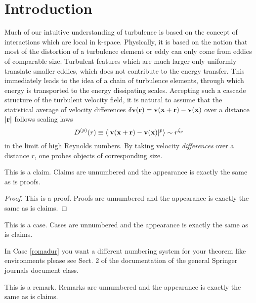 \documentclass[dc]{svjour}
\begin{document}

\section{Introduction}
\label{sec:intro}

Much of our intuitive understanding of turbulence is based on the
concept of interactions which are local in k-space. Physically,
it is based on the notion that most of the distortion of a turbulence
element or eddy can only come from eddies of comparable size.
Turbulent features which are much larger only uniformly translate
smaller eddies, which does not contribute to the energy transfer.
This immediately leads to the idea of a chain of turbulence elements,
through which energy is transported to the energy dissipating
scales. Accepting such a cascade structure of the turbulent velocity
field, it is natural to assume that the statistical average
of velocity differences ${\bf \delta v(r) = v(x+r) - v(x)}$ over a distance
$|{\bf r}|$ follows scaling laws
\begin{equation}
  \label{vscaling}
     D^{(p)}(r) \equiv \left<|{\bf v(x+r) - v(x)}|^p\right> \sim
r^{\zeta_p}
\end{equation}
in the limit of high Reynolds numbers. By taking velocity {\it differences}
over a distance $r$, one probes objects of corresponding size.

\begin{claim}
This is a claim. Claims are unnumbered and the appearance is exactly the
same as is proofs.
\end{claim}

\begin{proof}
This is a proof. Proofs are unnumbered and the appearance is exactly the
same as is claims.
\end{proof}

\begin{case}\label{romadur}
This is a case. Cases are unnumbered and the appearance is exactly the
same as is claims.
\end{case}

In Case \ref{romadur} you want a different numbering system for your
theorem like environments please see Sect. 2 of the documentation of the
general Springer journals document class.

\begin{remark}
This is a remark. Remarks are unnumbered and the appearance is exactly the
same as is claims.
\end{remark}
\end{document}
